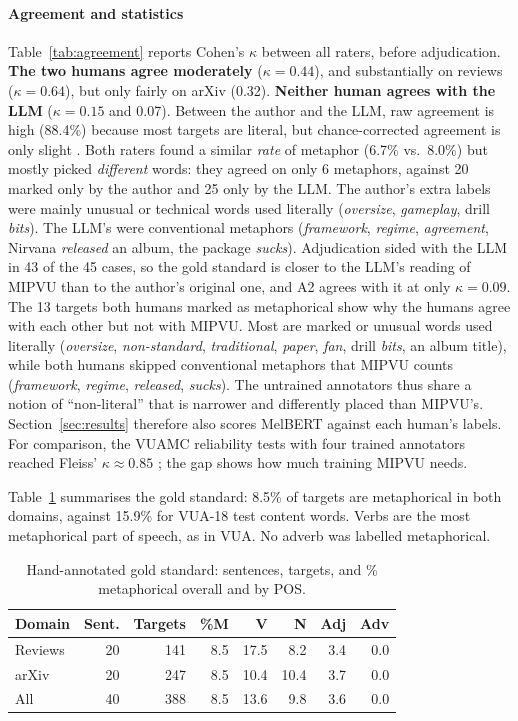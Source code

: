 \documentclass[11pt]{article}
\begin{document}
\paragraph{Agreement and statistics} Table~\ref{tab:agreement} reports Cohen's $\kappa$ \citep{cohen1960coefficient} between all raters, before adjudication. \textbf{The two humans agree moderately} ($\kappa = 0.44$), and substantially on reviews ($\kappa = 0.64$), but only fairly on arXiv (0.32). \textbf{Neither human agrees with the LLM} ($\kappa = 0.15$ and 0.07). Between the author and the LLM, raw agreement is high (88.4\%) because most targets are literal, but chance-corrected agreement is only slight \citep{landis1977measurement}. Both raters found a similar \emph{rate} of metaphor (6.7\% vs.\ 8.0\%) but mostly picked \emph{different} words: they agreed on only 6 metaphors, against 20 marked only by the author and 25 only by the LLM. The author's extra labels were mainly unusual or technical words used literally (\textit{oversize}, \textit{gameplay}, drill \textit{bits}). The LLM's were conventional metaphors (\textit{framework}, \textit{regime}, \textit{agreement}, Nirvana \textit{released} an album, the package \textit{sucks}). Adjudication sided with the LLM in 43 of the 45 cases, so the gold standard is closer to the LLM's reading of MIPVU than to the author's original one, and A2 agrees with it at only $\kappa = 0.09$. The 13 targets both humans marked as metaphorical show why the humans agree with each other but not with MIPVU. Most are marked or unusual words used literally (\textit{oversize}, \textit{non-standard}, \textit{traditional}, \textit{paper}, \textit{fan}, drill \textit{bits}, an album title), while both humans skipped conventional metaphors that MIPVU counts (\textit{framework}, \textit{regime}, \textit{released}, \textit{sucks}). The untrained annotators thus share a notion of ``non-literal'' that is narrower and differently placed than MIPVU's. Section~\ref{sec:results} therefore also scores MelBERT against each human's labels. For comparison, the VUAMC reliability tests with four trained annotators reached Fleiss' $\kappa \approx 0.85$ \citep{steen2010method}; the gap shows how much training MIPVU needs.

Table~\ref{tab:newstats} summarises the gold standard: 8.5\% of targets are metaphorical in both domains, against 15.9\% for VUA-18 test content words. Verbs are the most metaphorical part of speech, as in VUA. No adverb was labelled metaphorical.

\begin{table}[t]
\centering\small
\begin{tabular}{lrrrrrrr}
\toprule
Domain & Sent. & Targets & \%M & V & N & Adj & Adv \\
\midrule
Reviews & 20 & 141 & 8.5 & 17.5 & 8.2 & 3.4 & 0.0 \\
arXiv & 20 & 247 & 8.5 & 10.4 & 10.4 & 3.7 & 0.0 \\
\midrule
All & 40 & 388 & 8.5 & 13.6 & 9.8 & 3.6 & 0.0 \\
\bottomrule
\end{tabular}
\caption{Hand-annotated gold standard: sentences, targets, and \% metaphorical overall and by POS.}
\label{tab:newstats}
\end{table}
\end{document}
